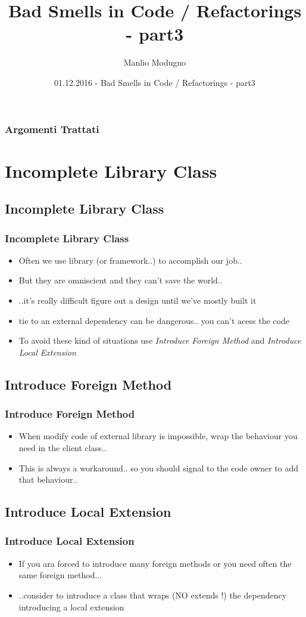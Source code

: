 \documentclass{beamer}
\title{Bad Smells in Code / Refactorings - part3}
\author{Manlio Modugno}
\institute[GMTechnologies]
\date[01.12.2016] 
{01.12.2016 - Bad Smells in Code / Refactorings - part3}
\begin{document}
\begin{frame}
  \titlepage
\end{frame}

\begin{frame}
  \frametitle{Argomenti Trattati}
  \tableofcontents
\end{frame}

\section{Incomplete Library Class}
\subsection{Incomplete Library Class}
\begin{frame}
  \frametitle{Incomplete Library Class}
  \begin{itemize}
	\item<+-> Often we use library (or framework..) to accomplish our job..
	\item<+-> But they are omniscient and they can't save the world.. 
	\item<+-> ..it's really difficult figure out a design until we've mostly built it
	\item<+-> tie to an external dependency can be dangerous.. you can't acess the code
	\item<+-> To avoid these kind of situations use \textit{Introduce Foreign Method} and \textit{Introduce Local Extension}
   \end{itemize}
\end{frame}

\subsection{Introduce Foreign Method}
\begin{frame}
  \frametitle{Introduce Foreign Method}
  \begin{itemize}
	\item<+-> When modify code of external library is impossible, wrap the behaviour you need in the client class..
	\item<+-> This is always a workaround.. so you should signal to the code owner to add that behaviour..
   \end{itemize}
\end{frame}

\subsection{Introduce Local Extension}
\begin{frame}
  \frametitle{Introduce Local Extension}
  \begin{itemize}
	\item<+-> If you ara forced to introduce many foreign methods or you need often the same foreign method...
	\item<+-> ..consider to introduce a class that wraps (NO extends !) the dependency introducing a local extension
   \end{itemize}
\end{frame}
\end{document}
